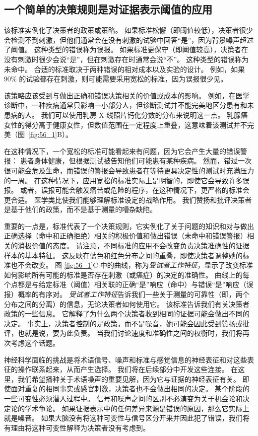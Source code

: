 \subsection{一个简单的决策规则是对证据表示阈值的应用}

该标准实例化了决策者的政策或策略。
如果标准松懈（即阈值较低），决策者很少会检测不到刺激，但他们通常会在没有刺激的试验中回答“是”，因为背景噪声超过了阈值。
这种类型的错误称为误报。
如果标准更保守（即阈值较高），决策者在没有刺激时很少会说“是”，但在刺激存在时通常会说“不”。
这种类型的错误称为未命中。
合适的标准取决于两种错误的相对成本以及实验的设计。
例如，如果 90\% 的试验都存在刺激，则可能需要采用宽松的标准，因为误报很少见。


该策略应该受到与做出正确和错误决策相关的价值或成本的影响。
例如，在医学诊断中，一种疾病通常只影响一小部分人，但诊断测试并不能完美地区分患有和未患病的人。
我们可以使用乳房 X 线照片钙化分数的分布来说明这一点。
乳腺癌女性的得分高于健康女性，但数值范围在一定程度上重叠，这意味着该测试并不完美（图~\ref{fig:56_1}B）。


在这种情况下，一个宽松的标准可能看起来有问题，因为它会产生大量的错误警报：
患者身体健康，但根据测试被告知他们可能患有某种疾病。
然而，错过一次很可能会危及生命，而错误的警报会导致患者在等待更具决定性的测试时充满压力的一周。
在这种情况下，应用宽松的标准实际上是明智的，即使它会导致许多误报。
或者，误报可能会触发痛苦或危险的程序，在这种情况下，更严格的标准会更合适。
医学类比使我们能够理解标准设定的战略作用。
我们赞扬和批评决策者是基于他们的政策，而不是基于测量的嘈杂缺陷。


重要的一点是，标准代表了一个决策规则，它实例化了关于问题的知识和对与做出正确选择（命中和正确拒绝）相关的积极价值和做出错误（未命中和错误警报）相关的消极价值的态度。
请注意，不同标准的应用不会改变负责决策准确性的证据样本的基本特征。
这反映在蓝色和红色分布之间的重叠，即使决策者调整她的标准也不会改变。
图 \ref{fig:56_1}C 中的曲线，称为\textit{受试者工作特征}，显示了改变标准如何影响所有可能的标准是否存在刺激（或癌症）的决定的准确性。
曲线上的每个点都是与给定标准（阈值）相关联的正确“是”响应（命中）与错误“是”响应（误报）概率的有序对。
\textit{受试者工作特征}告诉我们一些关于测量的可靠性（即，两个分布之间的分离）的信息，无论决策者如何使用它。
该标准告诉我们有关决策者政策的一些信息。
它解释了为什么两个决策者收到相同的证据可能会做出不同的决定。
事实上，决策者控制的是政策，而不是噪音，她可能会因此受到赞扬或批评，也就是说，要为此负责。
当我们讨论速度和准确性之间的权衡时，我们将再次考虑这个话题。


神经科学面临的挑战是将术语信号、噪声和标准与感觉信息的神经表征和对这些表征的操作联系起来，从而产生选择。
我们将在后续部分中开发这些连接。
在这里，我们希望播种关于术语噪声的重要见解，因为它与证据的神经表征有关。
即使面对重复的相同事实或感官刺激，决策者也不会做出相同的决定。
某个阶段的一些可变性必须潜入过程中。
信号和噪声之间的区别不必演变为关于机会论和决定论的学术争论。
如果证据表示中的任何差异来源是错误的原因，那么它实际上就是噪音。
如果大脑没有将这种可变性与信号区分开来并因此犯了错误，我们将有理由将这种可变性解释为决策者没有考虑到。


